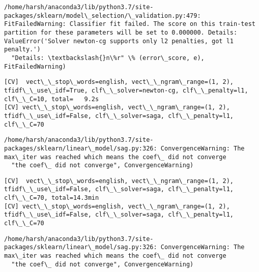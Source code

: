 \documentclass[11pt]{article}
\begin{document}
    \begin{Verbatim}[commandchars=\\\{\}]
/home/harsh/anaconda3/lib/python3.7/site-packages/sklearn/model\_selection/\_validation.py:479: FitFailedWarning: Classifier fit failed. The score on this train-test partition for these parameters will be set to 0.000000. Details: 
ValueError('Solver newton-cg supports only l2 penalties, got l1 penalty.')
  "Details: \textbackslash{}n\%r" \% (error\_score, e), FitFailedWarning)

    \end{Verbatim}

    \begin{Verbatim}[commandchars=\\\{\}]
[CV]  vect\_\_stop\_words=english, vect\_\_ngram\_range=(1, 2), tfidf\_\_use\_idf=True, clf\_\_solver=newton-cg, clf\_\_penalty=l1, clf\_\_C=10, total=   9.2s
[CV] vect\_\_stop\_words=english, vect\_\_ngram\_range=(1, 2), tfidf\_\_use\_idf=False, clf\_\_solver=saga, clf\_\_penalty=l1, clf\_\_C=70 

    \end{Verbatim}

    \begin{Verbatim}[commandchars=\\\{\}]
/home/harsh/anaconda3/lib/python3.7/site-packages/sklearn/linear\_model/sag.py:326: ConvergenceWarning: The max\_iter was reached which means the coef\_ did not converge
  "the coef\_ did not converge", ConvergenceWarning)

    \end{Verbatim}

    \begin{Verbatim}[commandchars=\\\{\}]
[CV]  vect\_\_stop\_words=english, vect\_\_ngram\_range=(1, 2), tfidf\_\_use\_idf=False, clf\_\_solver=saga, clf\_\_penalty=l1, clf\_\_C=70, total=14.3min
[CV] vect\_\_stop\_words=english, vect\_\_ngram\_range=(1, 2), tfidf\_\_use\_idf=False, clf\_\_solver=saga, clf\_\_penalty=l1, clf\_\_C=70 

    \end{Verbatim}

    \begin{Verbatim}[commandchars=\\\{\}]
/home/harsh/anaconda3/lib/python3.7/site-packages/sklearn/linear\_model/sag.py:326: ConvergenceWarning: The max\_iter was reached which means the coef\_ did not converge
  "the coef\_ did not converge", ConvergenceWarning)

    \end{Verbatim}
\end{document}
